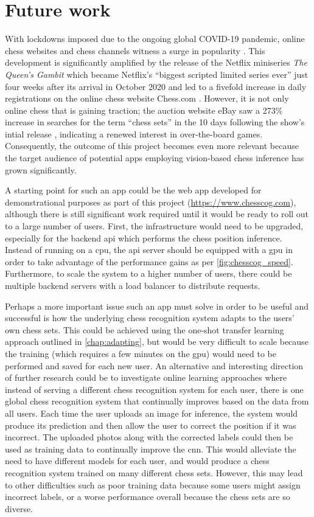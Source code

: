 \documentclass[../report.tex]{subfiles}
\begin{document}
\section{Future work}
With lockdowns imposed due to the ongoing global COVID-19 pandemic, online chess websites and chess channels witness a surge in popularity \cite{dottle2020}.
This development is significantly amplified by the release of the Netflix miniseries \textit{The Queen's Gambit} which became Netflix's ``biggest scripted limited series ever'' \cite{friedlander2020} just four weeks after its arrival in October 2020 and led to a fivefold increase in daily registrations on the online chess website Chess.com \cite{dottle2020}.
However, it is not only online chess that is gaining traction; the auction website eBay saw a 273\% increase in searches for the term ``chess sets'' in the 10 days following the show's intial release \cite{young2020}, indicating a renewed interest in over-the-board games.
Consequently, the outcome of this project becomes even more relevant because the target audience of potential apps employing vision-based chess inference has grown significantly.

A starting point for such an app could be the web app developed for demonstrational purposes as part of this project (\url{https://www.chesscog.com}), although there is still significant work required until it would be ready to roll out to a large number of users.
First, the infrastructure would need to be upgraded, especially for the backend \gls{api} which performs the chess position inference.
Instead of running on a \gls{cpu}, the \gls{api} server should be equipped with a \gls{gpu} in order to take advantage of the performance gains as per \cref{fig:chesscog_speed}.
Furthermore, to scale the system to a higher number of users, there could be multiple backend servers with a load balancer to distribute requests.

Perhaps a more important issue such an app must solve in order to be useful and successful is how the underlying chess recognition system adapts to the users' own chess sets.
This could be achieved using the one-shot transfer learning approach outlined in \cref{chap:adapting}, but would be very difficult to scale because the training (which requires a few minutes on the \gls{gpu}) would need to be performed and saved for each new user.
An alternative and interesting direction of further research could be to investigate online learning approaches where instead of serving a different chess recognition system for each user, there is one global chess recognition system that continually improves based on the data from all users.
Each time the user uploads an image for inference, the system would produce its prediction and then allow the user to correct the position if it was incorrect.
The uploaded photos along with the corrected labels could then be used as training data to continually improve the \gls{cnn}.
This would alleviate the need to have different models for each user, and would produce a chess recognition system trained on many different chess sets.
However, this may lead to other difficulties such as poor training data because some users might assign incorrect labels, or a worse performance overall because the chess sets are so diverse.
\end{document}
